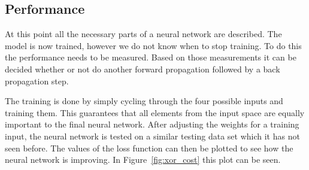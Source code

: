 \subsection{Performance}\label{s:perf}
At this point all the necessary parts of a neural network are described.
The model is now trained, however we do not know when to stop training.
To do this the performance needs to be measured.
Based on those measurements it can be decided whether or not do another forward propagation followed by a back propagation step.

The training is done by simply cycling through the four possible inputs and training them.
This guarantees that all elements from the input space are equally important to the final neural network.
After adjusting the weights for a training input, the neural network is tested on a similar testing data set which it has not seen before.
The values of the loss function can then be plotted to see how the neural network is improving. In Figure~\ref{fig:xor_cost} this plot can be seen.

